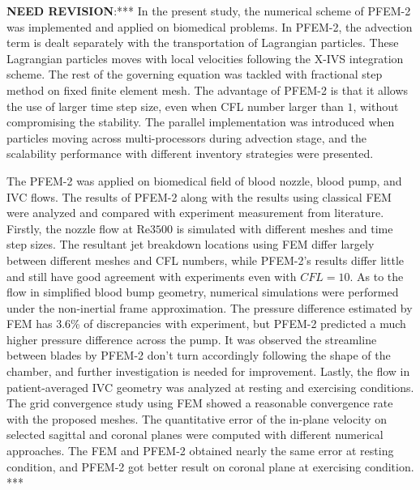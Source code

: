 \textbf{NEED REVISION}:*** In the present study, the numerical scheme of PFEM-2 was implemented and applied on biomedical problems. In PFEM-2, the advection term is dealt separately with the transportation of Lagrangian particles. These Lagrangian particles moves with local velocities following the X-IVS integration scheme. The rest of the governing equation was tackled with fractional step method on fixed finite element mesh. The advantage of PFEM-2 is that it allows the use of larger time step size, even when CFL number larger than $1$, without compromising the stability. The parallel implementation was introduced when particles moving across multi-processors during advection stage, and the scalability performance with different inventory strategies were presented. 

The PFEM-2 was applied on biomedical field of blood nozzle, blood pump, and IVC flows. The results of PFEM-2 along with the results using classical FEM were analyzed and compared with experiment measurement from literature. Firstly, the nozzle flow at Re$3500$ is simulated with different meshes and time step sizes. The resultant jet breakdown locations using FEM differ largely between different meshes and CFL numbers, while PFEM-2's results differ little and still have good agreement with experiments even with $CFL=10$. As to the flow in simplified blood bump geometry, numerical simulations were performed under the non-inertial frame approximation. The pressure difference estimated by FEM has $3.6$\% of discrepancies with experiment, but PFEM-2 predicted a much higher pressure difference across the pump. It was observed the streamline between blades by PFEM-2 don't turn accordingly following the shape of the chamber, and further investigation is needed for improvement. Lastly, the flow in patient-averaged IVC geometry was analyzed at resting and exercising conditions. The grid convergence study using FEM showed a reasonable convergence rate with the proposed meshes. The quantitative error of the in-plane velocity on selected sagittal and coronal planes were computed with different numerical approaches. The FEM and PFEM-2 obtained nearly the same error at resting condition, and PFEM-2 got better result on coronal plane at exercising condition.
***